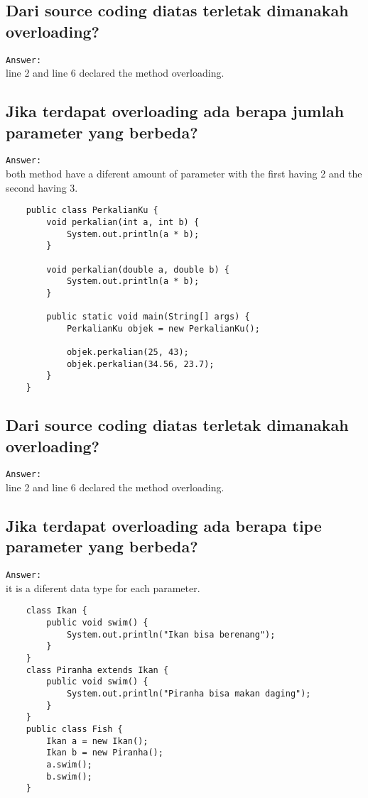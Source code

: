 \documentclass[12pt,titlepage]{article}
\begin{document}
\subsection{\textnormal{Dari source coding diatas terletak dimanakah overloading?}}
\texttt{Answer:}\\
line 2 and line 6 declared the method overloading.
\subsection{\textnormal{Jika terdapat overloading ada berapa jumlah parameter yang berbeda?}}
\texttt{Answer:}\\
both method have a diferent amount of parameter with the first having 2 and the second having 3.

\newpage

\begin{verbatim}
    public class PerkalianKu {
        void perkalian(int a, int b) {
            System.out.println(a * b);
        }

        void perkalian(double a, double b) {
            System.out.println(a * b);
        }

        public static void main(String[] args) {
            PerkalianKu objek = new PerkalianKu();

            objek.perkalian(25, 43);
            objek.perkalian(34.56, 23.7);
        }
    }
\end{verbatim}
\subsection{\textnormal{Dari source coding diatas terletak dimanakah overloading?}}
\texttt{Answer:}\\
line 2 and line 6 declared the method overloading.
\subsection{\textnormal{Jika terdapat overloading ada berapa tipe parameter yang berbeda?}}
\texttt{Answer:}\\
it is a diferent data type for each parameter.

\newpage

\begin{verbatim}
    class Ikan {
        public void swim() {
            System.out.println("Ikan bisa berenang");
        }
    }
    class Piranha extends Ikan {
        public void swim() {
            System.out.println("Piranha bisa makan daging");
        }
    }
    public class Fish {
        Ikan a = new Ikan();
        Ikan b = new Piranha();
        a.swim();
        b.swim();
    }
\end{verbatim}
\end{document}
